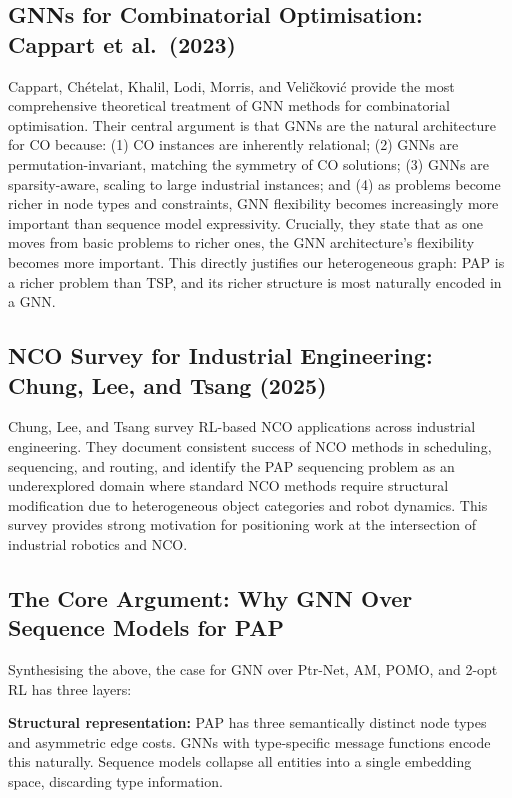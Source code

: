 \documentclass[conference]{IEEEtran}
\begin{document}
\subsection{GNNs for Combinatorial Optimisation: Cappart et al.\ (2023)}

Cappart, Ch\'{e}telat, Khalil, Lodi, Morris, and Veli\v{c}kovi\'{c} \cite{cappart2023gnnco} provide the most comprehensive theoretical treatment of GNN methods for combinatorial optimisation. Their central argument is that GNNs are the natural architecture for CO because: (1) CO instances are inherently relational; (2) GNNs are permutation-invariant, matching the symmetry of CO solutions; (3) GNNs are sparsity-aware, scaling to large industrial instances; and (4) as problems become richer in node types and constraints, GNN flexibility becomes increasingly more important than sequence model expressivity. Crucially, they state that as one moves from basic problems to richer ones, the GNN architecture's flexibility becomes more important. This directly justifies our heterogeneous graph: PAP is a richer problem than TSP, and its richer structure is most naturally encoded in a GNN.

\subsection{NCO Survey for Industrial Engineering: Chung, Lee, and Tsang (2025)}

Chung, Lee, and Tsang \cite{chung2025ncosurvey} survey RL-based NCO applications across industrial engineering. They document consistent success of NCO methods in scheduling, sequencing, and routing, and identify the PAP sequencing problem as an underexplored domain where standard NCO methods require structural modification due to heterogeneous object categories and robot dynamics. This survey provides strong motivation for positioning work at the intersection of industrial robotics and NCO.

\subsection{The Core Argument: Why GNN Over Sequence Models for PAP}

Synthesising the above, the case for GNN over Ptr-Net, AM, POMO, and 2-opt RL has three layers:

\textbf{Structural representation:} PAP has three semantically distinct node types and asymmetric edge costs. GNNs with type-specific message functions encode this naturally. Sequence models collapse all entities into a single embedding space, discarding type information.
\end{document}
